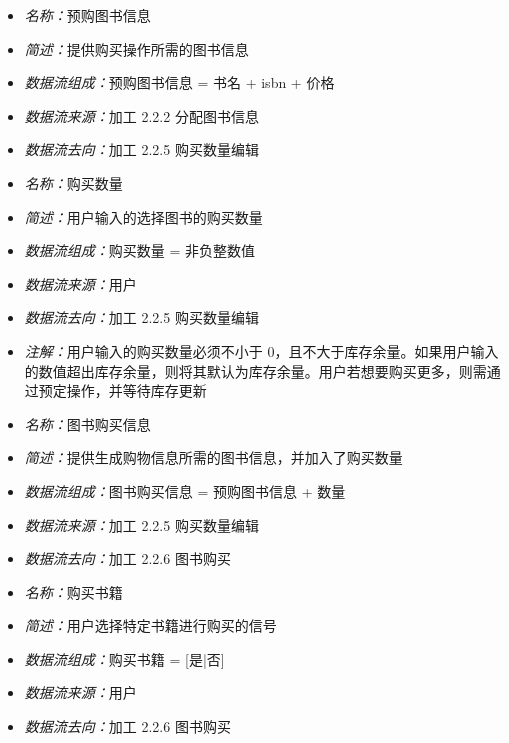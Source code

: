 \vspace{-1mm}

\begin{itemize}
\item \textit{名称：}预购图书信息
\item \textit{简述：}提供购买操作所需的图书信息
\item \textit{数据流组成：}预购图书信息  = 书名 + isbn + 价格
\item \textit{数据流来源：}加工 2.2.2 分配图书信息
\item \textit{数据流去向：}加工 2.2.5 购买数量编辑
\end{itemize}

\vspace{-1mm}

\begin{itemize}
	\item \textit{名称：}购买数量
	\item \textit{简述：}用户输入的选择图书的购买数量
	\item \textit{数据流组成：}购买数量 = 非负整数值
	\item \textit{数据流来源：}用户
	\item \textit{数据流去向：}加工 2.2.5 购买数量编辑
	\item \textit{注解：}用户输入的购买数量必须不小于 0，且不大于库存余量。如果用户输入的数值超出库存余量，则将其默认为库存余量。用户若想要购买更多，则需通过预定操作，并等待库存更新
\end{itemize}

\vspace{-1mm}

\begin{itemize}
	\item \textit{名称：}图书购买信息
	\item \textit{简述：}提供生成购物信息所需的图书信息，并加入了购买数量
	\item \textit{数据流组成：}图书购买信息  = 预购图书信息 + 数量
	\item \textit{数据流来源：}加工 2.2.5 购买数量编辑
	\item \textit{数据流去向：}加工 2.2.6 图书购买
\end{itemize}

\vspace{-1mm}

\begin{itemize}
	\item \textit{名称：}购买书籍
	\item \textit{简述：}用户选择特定书籍进行购买的信号
	\item \textit{数据流组成：}购买书籍 = [是|否]
	\item \textit{数据流来源：}用户
	\item \textit{数据流去向：}加工 2.2.6 图书购买
\end{itemize}

